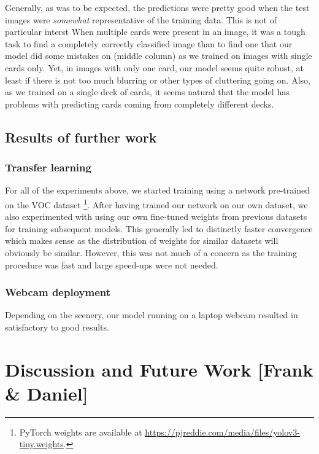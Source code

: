 \documentclass[a4paper]{article}
\begin{document}
Generally, as was to be expected, the predictions were pretty good when the test images were \textit{somewhat} representative of the training data. This is not of particular interst
When multiple cards were present in an image, it was a tough task to find a completely correctly classified image than to find one that our model did some mistakes on (middle column) as we trained on images with single cards only. Yet, in images with only one card, our model seems quite robust, at least if there is not too much blurring or other types of cluttering going on. Also, as we trained on a single deck of cards, it seems natural that the model has problems with predicting cards coming from completely different decks.
\subsection*{Results of further work}
\subsubsection*{Transfer learning}
For all of the experiments above, we started training using a network pre-trained on the VOC dataset \cite{Everingham15}\footnote{PyTorch weights are available at \url{https://pjreddie.com/media/files/yolov3-tiny.weights}.}. After having trained our network on our own dataset, we also experimented with using our own fine-tuned weights from previous datasets for training subsequent models. This generally led to distinctly faster convergence which makes sense as the distribution of weights for similar datasets will obviously be similar. However, this was not much of a concern as the training procedure was fast and large speed-ups were not needed.
\subsubsection*{Webcam deployment}
Depending on the scenery, our model running on a laptop webcam resulted in satisfactory to good results.
\section{Discussion and Future Work [Frank \& Daniel]}
\end{document}
